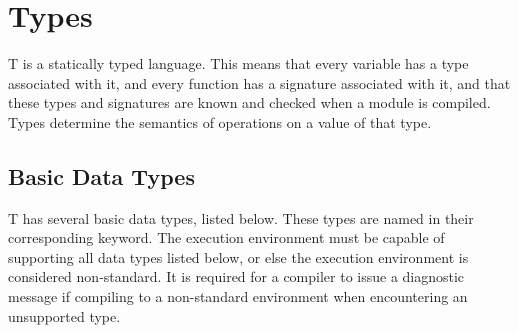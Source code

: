 \documentclass[letterpaper,12pt]{book}
\begin{document}
\chapter{Types}

T is a statically typed language. This means that every variable has a type associated with it, and every function has a signature associated with it, and that these types and signatures are known and checked when a module is compiled. Types determine the semantics of operations on a value of that type.

\section{Basic Data Types}

T has several basic data types, listed below. These types are named in their corresponding keyword. The execution environment must be capable of supporting all data types listed below, or else the execution environment is considered non-standard. It is required for a compiler to issue a diagnostic message if compiling to a non-standard environment when encountering an unsupported type.
\end{document}

